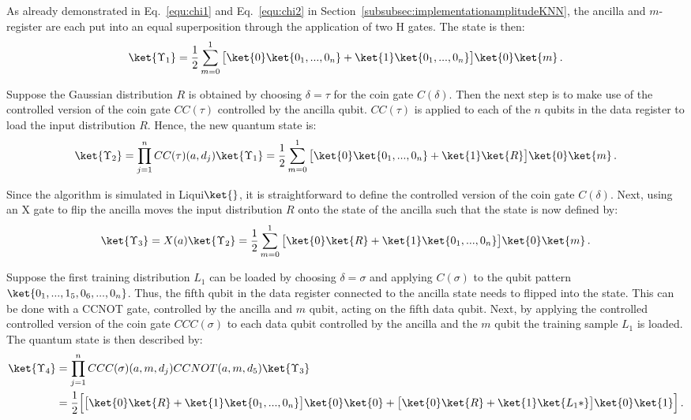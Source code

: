 As already demonstrated in Eq.~\ref{equ:chi1} and Eq.~\ref{equ:chi2} in Section~\ref{subsubsec:implementationamplitudeKNN}, the ancilla and $m$-register are each put into an equal superposition through the application of two H gates. The state is then:
\begin{equation}
\ket{\Upsilon_1} = \frac{1}{2} \sum_{m=0}^1 \big[ \ket{0}\ket{0_1,...,0_n} + \ket{1}\ket{0_1,...,0_n}\big] \ket{0}\ket{m}\, .
\end{equation}

Suppose the Gaussian distribution $R$ is obtained by choosing $\delta = \tau$ for the coin gate $C(\delta)$. Then the next step is to make use of the controlled version of the coin gate $CC(\tau)$ controlled by the ancilla qubit. $CC(\tau)$ is applied to each of the $n$ qubits in the data register to load the input distribution $R$. Hence, the new quantum state is:
\begin{equation}
\ket{\Upsilon_2} = \prod^n_{j=1} CC(\tau)(a,d_j) \ket{\Upsilon_1} = \frac{1}{2} \sum_{m=0}^1 \big[ \ket{0}\ket{0_1,...,0_n} + \ket{1}\ket{R}\big] \ket{0}\ket{m}\, .
\end{equation}

Since the algorithm is simulated in Liqui$\ket{}$, it is straightforward to define the controlled version of the coin gate $C(\delta)$. Next, using an X gate to flip the ancilla moves the input distribution $R$ onto the \0 state of the ancilla such that the state is now defined by:
\begin{equation}
\ket{\Upsilon_3} = X(a) \ket{\Upsilon_2} = \frac{1}{2} \sum_{m=0}^1 \big[ \ket{0}\ket{R} + \ket{1}\ket{0_1,...,0_n}\big] \ket{0}\ket{m}\, .
\end{equation}

Suppose the first training distribution $L_1$ can be loaded by choosing $\delta = \sigma$ and applying $C(\sigma)$ to the qubit pattern $\ket{0_1,...,1_5,0_6,...,0_n}$. Thus, the fifth qubit in the data register connected to the \1 ancilla state needs to flipped into the \1 state. This can be done with a CCNOT gate, controlled by the ancilla and $m$ qubit, acting on the fifth data qubit. Next, by applying the controlled controlled version of the coin gate $CCC(\sigma)$ to each data qubit controlled by the ancilla and the $m$ qubit the training sample $L_1$ is loaded. The quantum state is then described by:
\begin{align}
\ket{\Upsilon_4} &= \prod^n_{j=1} CCC(\sigma)(a,m,d_j) CCNOT(a,m,d_5) \ket{\Upsilon_3}\notag\\
&= \frac{1}{2} \Big[\big[ \ket{0}\ket{R} + \ket{1}\ket{0_1,...,0_n}\big] \ket{0}\ket{0} + \big[\ket{0}\ket{R} + \ket{1}\ket{L_1*}\big] \ket{0}\ket{1}\Big]\, .
\end{align}

